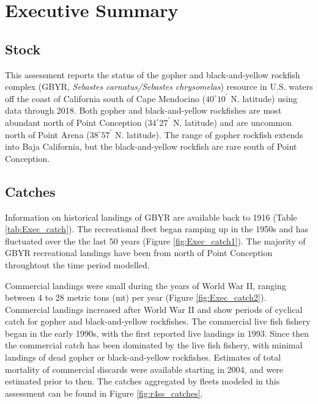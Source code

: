 \documentclass[12pt,]{article}
\begin{document}
{
\setcounter{tocdepth}{4}
\tableofcontents
}
\setlength{\parskip}{5mm plus1mm minus1mm} \pagebreak

\setcounter{page}{1} \renewcommand{\thefigure}{\alph{figure}}
\renewcommand{\thetable}{\alph{table}}

\section*{Executive Summary}\label{executive-summary}

\subsection*{Stock}\label{stock}

This assessment reports the status of the gopher and black-and-yellow
rockfish\\
complex (GBYR, \emph{Sebastes carnatus/Sebastes chrysomelas}) resource
in U.S. waters off the coast of California south of Cape Mendocino
(\(40^\circ 10^\prime\) N. latitude) using data through 2018. Both
gopher and black-and-yellow rockfishes are most abundant north of Point
Conception (\(34^\circ 27^\prime\) N. latitude) and are uncommon north
of Point Arena (\(38^\circ 57^\prime\) N. latitude). The range of gopher
rockfish extends into Baja California, but the black-and-yellow rockfish
are rare south of Point Conception.

\subsection*{Catches}\label{catches}

Information on historical landings of GBYR are available back to 1916
(Table \ref{tab:Exec_catch}). The recreational fleet began ramping up in
the 1950s and has fluctuated over the the last 50 years (Figure
\ref{fig:Exec_catch1}). The majority of GBYR recreational landings have
been from north of Point Conception throughtout the time period
modelled.

Commercial landings were small during the years of World War II, ranging
between 4 to 28 metric tons (mt) per year (Figure
\ref{fig:Exec_catch2}). Commercial landings increased after World War II
and show periods of cyclical catch for gopher and black-and-yellow
rockfishes. The commercial live fish fishery began in the early 1990s,
with the first reported live landings in 1993. Since then the commercial
catch has been dominated by the live fish fishery, with minimal landings
of dead gopher or black-and-yellow rockfishes. Estimates of total
mortality of commercial discards were available starting in 2004, and
were estimated prior to then. The catches aggregated by fleets modeled
in this assessment can be found in Figure \ref{fig:r4ss_catches}.
\end{document}
